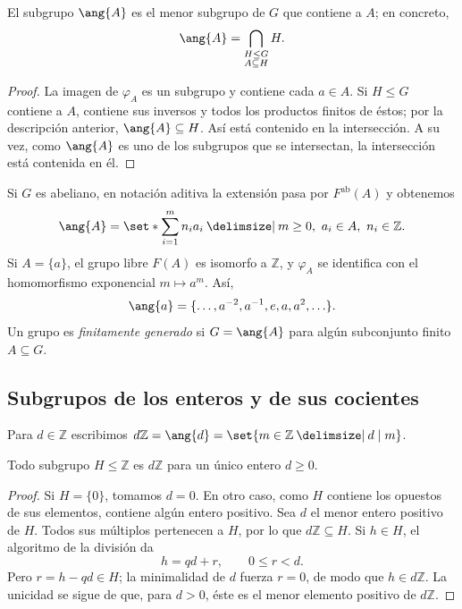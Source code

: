 \begin{prop}\label{prop:C4-generado}
El subgrupo $\ang{A}$ es el menor subgrupo de $G$ que contiene a $A$; en concreto,
\[
\ang{A}=\bigcap_{\substack{H\le G\\A\subseteq H}}H.
\]
\end{prop}
\begin{proof}
La imagen de $\varphi_A$ es un subgrupo y contiene cada $a\in A$. Si $H\le G$ contiene a $A$, contiene sus inversos y todos los productos finitos de éstos; por la descripción anterior, $\ang{A}\subseteq H$. Así está contenido en la intersección. A su vez, como $\ang{A}$ es uno de los subgrupos que se intersectan, la intersección está contenida en él.
\end{proof}

Si $G$ es abeliano, en notación aditiva la extensión pasa por $F^{\mathrm{ab}}(A)$ y obtenemos
\[
\ang{A}=\set*{\sum_{i=1}^m n_i a_i\given
m\ge0,\ a_i\in A,\ n_i\in\mathbb Z}.
\]
Si $A=\{a\}$, el grupo libre $F(A)$ es isomorfo a $\mathbb Z$, y $\varphi_A$ se identifica con el homomorfismo exponencial $m\mapsto a^m$. Así,
\[
\ang{a}=\{\ldots,a^{-2},a^{-1},e,a,a^2,\ldots\}.
\]
Un grupo es \emph{finitamente generado} si $G=\ang{A}$ para algún subconjunto finito $A\subseteq G$.

\subsection{Subgrupos de los enteros y de sus cocientes}\label{tema:4-3-1}
Para $d\in\mathbb Z$ escribimos $d\mathbb Z=\ang{d}=\set{m\in\mathbb Z\given d\mid m}$.

\begin{prop}\label{prop:C4-subgrupos-Z}
Todo subgrupo $H\le\mathbb Z$ es $d\mathbb Z$ para un único entero $d\ge0$.
\end{prop}
\begin{proof}
Si $H=\{0\}$, tomamos $d=0$. En otro caso, como $H$ contiene los opuestos de sus elementos, contiene algún entero positivo. Sea $d$ el menor entero positivo de $H$. Todos sus múltiplos pertenecen a $H$, por lo que $d\mathbb Z\subseteq H$. Si $h\in H$, el algoritmo de la división da
\[
h=qd+r,\qquad 0\le r<d.
\]
Pero $r=h-qd\in H$; la minimalidad de $d$ fuerza $r=0$, de modo que $h\in d\mathbb Z$. La unicidad se sigue de que, para $d>0$, éste es el menor elemento positivo de $d\mathbb Z$.
\end{proof}

